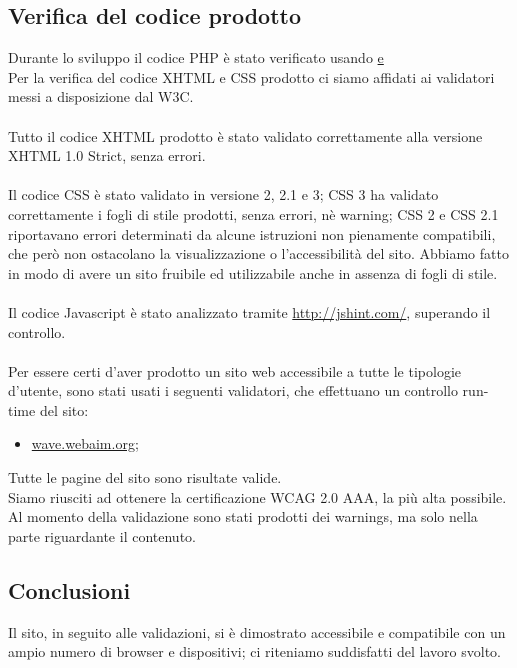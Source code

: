 {	\subsection{Verifica del codice prodotto}{
		Durante lo sviluppo il codice PHP è stato verificato  usando \href{http://phpcodechecker.com/} e \href{http://phpfiddle.org/}
		\\
		Per la verifica del codice XHTML e CSS prodotto ci siamo affidati ai validatori messi a disposizione dal W3C.\\
		\\
		Tutto il codice XHTML prodotto è stato validato correttamente alla versione XHTML 1.0 Strict, senza errori.\\
		\\
		Il codice CSS è stato validato in versione 2, 2.1 e 3; CSS 3 ha validato correttamente i fogli di stile prodotti, senza errori, nè warning; CSS 2 e CSS 2.1 riportavano errori determinati da alcune istruzioni non pienamente compatibili, che però non ostacolano la visualizzazione o l'accessibilità del sito. Abbiamo fatto in modo di avere un sito fruibile ed utilizzabile anche in assenza di fogli di stile.\\
		\\
		Il codice Javascript è stato analizzato tramite \url{http://jshint.com/}, superando il controllo.\\
		\\
		Per essere certi d'aver prodotto un sito web accessibile a tutte le tipologie d'utente, sono stati usati i seguenti validatori, che effettuano un controllo run-time del sito:
		\begin{itemize}\itemsep1pt
			\item \href{http://wave.webaim.org/}{wave.webaim.org};
		\end{itemize}
		Tutte le pagine del sito sono risultate valide.\\
		Siamo riusciti ad ottenere la certificazione WCAG 2.0 AAA, la più alta possibile. Al momento della validazione sono stati prodotti dei warnings, ma solo nella parte riguardante il contenuto. %
	}
	
	\subsection{Conclusioni}
		Il sito, in seguito alle validazioni, si è dimostrato accessibile e compatibile con un ampio numero di browser e dispositivi; ci riteniamo suddisfatti del lavoro svolto.
}